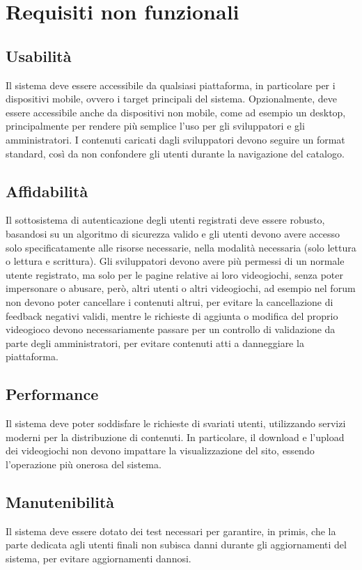 \section{Requisiti non funzionali}
\subsection{Usabilità}
Il sistema deve essere accessibile da qualsiasi piattaforma, in particolare per i dispositivi mobile, ovvero i target principali del sistema. Opzionalmente, deve essere accessibile anche da dispositivi non mobile, come ad esempio un desktop, principalmente per rendere più semplice l’uso per gli sviluppatori e gli amministratori. I contenuti caricati dagli sviluppatori devono seguire un format standard, così da non confondere gli utenti durante la navigazione del catalogo.

\subsection{Affidabilità}
Il sottosistema di autenticazione degli utenti registrati deve essere robusto, basandosi su un algoritmo di sicurezza valido e gli utenti devono avere accesso solo specificatamente alle risorse necessarie, nella modalità necessaria (solo lettura o lettura e scrittura). Gli sviluppatori devono avere più permessi di un normale utente registrato, ma solo per le pagine relative ai loro videogiochi, senza poter impersonare o abusare, però, altri utenti o altri videogiochi, ad esempio nel forum non devono poter cancellare i contenuti altrui, per evitare la cancellazione di feedback negativi validi, mentre le richieste di aggiunta o modifica del proprio videogioco devono necessariamente passare per un controllo di validazione da parte degli amministratori, per evitare contenuti atti a danneggiare la piattaforma.

\subsection{Performance}
Il sistema deve poter soddisfare le richieste di svariati utenti, utilizzando servizi moderni per la distribuzione di contenuti. In particolare, il download e l’upload dei videogiochi non devono impattare la visualizzazione del sito, essendo l’operazione più onerosa del sistema.

\subsection{Manutenibilità}
Il sistema deve essere dotato dei test necessari per garantire, in primis, che la parte dedicata agli utenti finali non subisca danni durante gli aggiornamenti del sistema, per evitare aggiornamenti dannosi.

